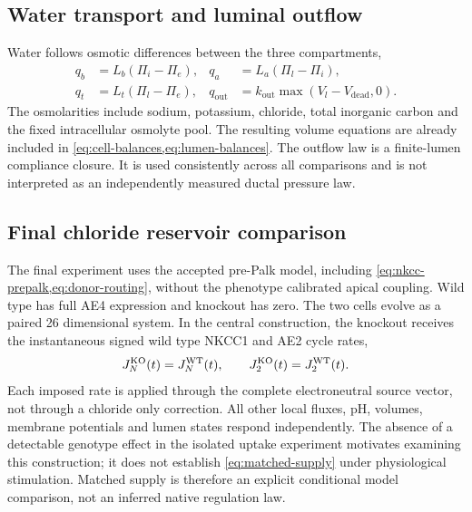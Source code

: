 \documentclass[11pt]{article}
\begin{document}
\subsection{Water transport and luminal outflow}

Water follows osmotic differences between the three compartments,
\begin{align*}
    q_b&=L_b(\Pi_i-\Pi_e), & q_a&=L_a(\Pi_l-\Pi_i),\\
    q_t&=L_t(\Pi_l-\Pi_e), & q_{\mathrm{out}}&=k_{\mathrm{out}}\max(V_l-V_{\mathrm{dead}},0).
\end{align*}
The osmolarities include sodium, potassium, chloride, total inorganic carbon and the fixed intracellular osmolyte pool. The resulting volume equations are already included in \cref{eq:cell-balances,eq:lumen-balances}. The outflow law is a finite-lumen compliance closure. It is used consistently across all comparisons and is not interpreted as an independently measured ductal pressure law.

\subsection{Final chloride reservoir comparison}
\label{sec:reservoir-comparison}

The final experiment uses the accepted pre-Palk model, including \cref{eq:nkcc-prepalk,eq:donor-routing}, without the phenotype calibrated apical coupling. Wild type has full AE4 expression and knockout has zero. The two cells evolve as a paired 26 dimensional system. In the central construction, the knockout receives the instantaneous signed wild type NKCC1 and AE2 cycle rates,
\begin{equation}
 J_N^{\rm KO}(t)=J_N^{\rm WT}(t),\qquad
 J_2^{\rm KO}(t)=J_2^{\rm WT}(t).
 \label{eq:matched-supply}
\end{equation}
Each imposed rate is applied through the complete electroneutral source vector, not through a chloride only correction. All other local fluxes, pH, volumes, membrane potentials and lumen states respond independently. The absence of a detectable genotype effect in the isolated uptake experiment motivates examining this construction; it does not establish \cref{eq:matched-supply} under physiological stimulation. Matched supply is therefore an explicit conditional model comparison, not an inferred native regulation law.
\end{document}
